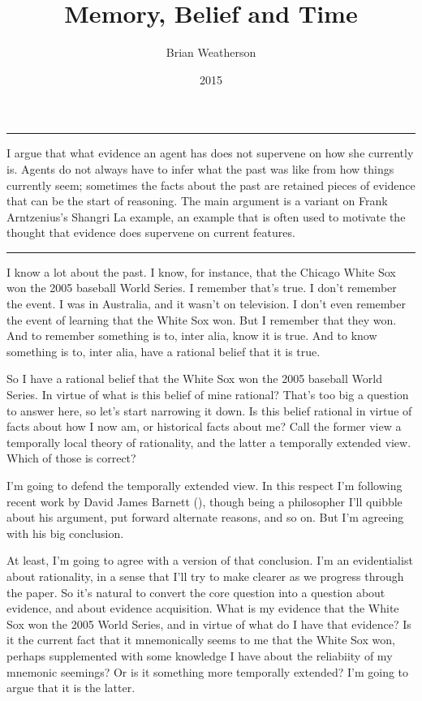 \documentclass[
  10pt,
  letterpaper,
  DIV=11,
  numbers=noendperiod,
  twoside]{scrartcl}
\title{Memory, Belief and Time}
\author{Brian Weatherson}
\date{2015}
\renewenvironment{abstract}
 {\vspace{-1.25cm}
 \quotation\small\noindent\rule{\linewidth}{.5pt}\par\smallskip
 \noindent }
 {\par\noindent\rule{\linewidth}{.5pt}\endquotation}
\begin{document}
\maketitle
\begin{abstract}
I argue that what evidence an agent has does not supervene on how she
currently is. Agents do not always have to infer what the past was like
from how things currently seem; sometimes the facts about the past are
retained pieces of evidence that can be the start of reasoning. The main
argument is a variant on Frank Arntzenius's Shangri La example, an
example that is often used to motivate the thought that evidence does
supervene on current features.
\end{abstract}

I know a lot about the past. I know, for instance, that the Chicago
White Sox won the 2005 baseball World Series. I remember that's true. I
don't remember the event. I was in Australia, and it wasn't on
television. I don't even remember the event of learning that the White
Sox won. But I remember that they won. And to remember something is to,
inter alia, know it is true. And to know something is to, inter alia,
have a rational belief that it is true.

So I have a rational belief that the White Sox won the 2005 baseball
World Series. In virtue of what is this belief of mine rational? That's
too big a question to answer here, so let's start narrowing it down. Is
this belief rational in virtue of facts about how I now am, or
historical facts about me? Call the former view a temporally local
theory of rationality, and the latter a temporally extended view. Which
of those is correct?

I'm going to defend the temporally extended view. In this respect I'm
following recent work by David James Barnett
(), though being a philosopher I'll
quibble about his argument, put forward alternate reasons, and so on.
But I'm agreeing with his big conclusion.

At least, I'm going to agree with a version of that conclusion. I'm an
evidentialist about rationality, in a sense that I'll try to make
clearer as we progress through the paper. So it's natural to convert the
core question into a question about evidence, and about evidence
acquisition. What is my evidence that the White Sox won the 2005 World
Series, and in virtue of what do I have that evidence? Is it the current
fact that it mnemonically seems to me that the White Sox won, perhaps
supplemented with some knowledge I have about the reliabiity of my
mnemonic seemings? Or is it something more temporally extended? I'm
going to argue that it is the latter.
\end{document}
